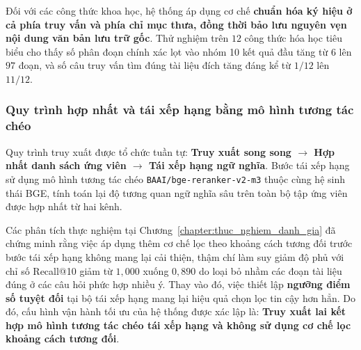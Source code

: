 Đối với các công thức khoa học, hệ thống áp dụng cơ chế \textbf{chuẩn hóa ký hiệu ở cả phía truy vấn và phía chỉ mục thưa, đồng thời bảo lưu nguyên vẹn nội dung văn bản lưu trữ gốc}. Thử nghiệm trên $12$ công thức hóa học tiêu biểu cho thấy số phân đoạn chính xác lọt vào nhóm 10 kết quả đầu tăng từ $6$ lên $97$ đoạn, và số câu truy vấn tìm đúng tài liệu đích tăng đáng kể từ $1/12$ lên $11/12$.

\subsubsection{Quy trình hợp nhất và tái xếp hạng bằng mô hình tương tác chéo}
Quy trình truy xuất được tổ chức tuần tự: \textbf{Truy xuất song song $\rightarrow$ Hợp nhất danh sách ứng viên $\rightarrow$ Tái xếp hạng ngữ nghĩa}. Bước tái xếp hạng sử dụng mô hình tương tác chéo \texttt{BAAI/bge-reranker-v2-m3} thuộc cùng hệ sinh thái BGE, tính toán lại độ tương quan ngữ nghĩa sâu trên toàn bộ tập ứng viên được hợp nhất từ hai kênh.

Các phân tích thực nghiệm tại Chương~\ref{chapter:thuc_nghiem_danh_gia} đã chứng minh rằng việc áp dụng thêm cơ chế lọc theo khoảng cách tương đối trước bước tái xếp hạng không mang lại cải thiện, thậm chí làm suy giảm độ phủ với chỉ số Recall@10 giảm từ $1{,}000$ xuống $0{,}890$ do loại bỏ nhầm các đoạn tài liệu đúng ở các câu hỏi phức hợp nhiều ý. Thay vào đó, việc thiết lập \textbf{ngưỡng điểm số tuyệt đối} tại bộ tái xếp hạng mang lại hiệu quả chọn lọc tin cậy hơn hẳn. Do đó, cấu hình vận hành tối ưu của hệ thống được xác lập là: \textbf{Truy xuất lai kết hợp mô hình tương tác chéo tái xếp hạng và không sử dụng cơ chế lọc khoảng cách tương đối}.


